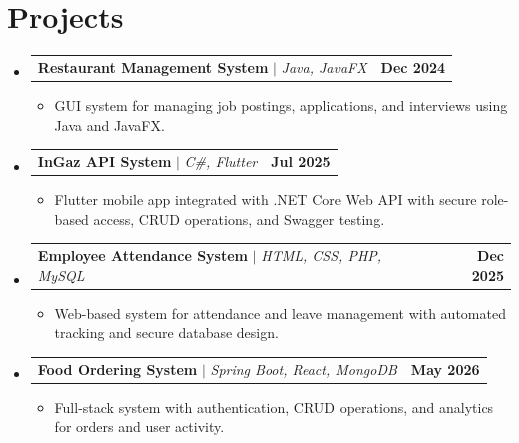 \documentclass[letterpaper,11pt]{article}
\makeatletter
\newcommand{\resumeItem}[1]{
  \item\small{
    {#1 \vspace{-2pt}}
  }
}
\newcommand{\resumeProjectHeading}[2]{
    \item
    \begin{tabular*}{1.001\textwidth}{l@{\extracolsep{\fill}}r}
      \small#1 & \textbf{\small #2}\\
    \end{tabular*}\vspace{-7pt}
}
\newcommand{\resumeSubHeadingListStart}{\begin{itemize}[leftmargin=0.0in, label={}]}
\newcommand{\resumeSubHeadingListEnd}{\end{itemize}}
\newcommand{\resumeItemListStart}{\begin{itemize}}
\newcommand{\resumeItemListEnd}{\end{itemize}\vspace{-5pt}}
\makeatother
\begin{document}
\section{Projects}
    \vspace{-5pt}
    \resumeSubHeadingListStart
      \resumeProjectHeading
          {\textbf{Restaurant Management System} $|$ \emph{Java, JavaFX}}{Dec 2024}
          \resumeItemListStart
            \resumeItem{GUI system for managing job postings, applications, and interviews using Java and JavaFX.}
          \resumeItemListEnd
          \vspace{-13pt}

      \resumeProjectHeading
          {\textbf{InGaz API System} $|$ \emph{C\#, Flutter}}{Jul 2025}
          \resumeItemListStart
            \resumeItem{Flutter mobile app integrated with .NET Core Web API with secure role-based access, CRUD operations, and Swagger testing.}
          \resumeItemListEnd
          \vspace{-13pt}

      \resumeProjectHeading
          {\textbf{Employee Attendance System} $|$ \emph{HTML, CSS, PHP, MySQL}}{Dec 2025}
          \resumeItemListStart
            \resumeItem{Web-based system for attendance and leave management with automated tracking and secure database design.}
          \resumeItemListEnd
          \vspace{-13pt}

      \resumeProjectHeading
          {\textbf{Food Ordering System} $|$ \emph{Spring Boot, React, MongoDB}}{May 2026}
          \resumeItemListStart
            \resumeItem{Full-stack system with authentication, CRUD operations, and analytics for orders and user activity.}
          \resumeItemListEnd
          \vspace{-13pt}
    \resumeSubHeadingListEnd
\vspace{-2pt}

\end{document}

